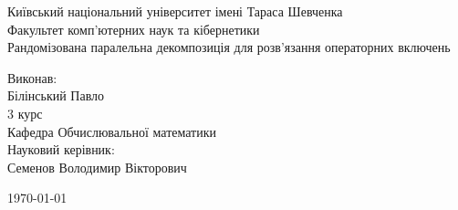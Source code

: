 \documentclass[12pt]{article}
\begin{document}
	\begin{titlepage}
		\begin{center}
			\vspace*{-1cm}
			{\Large Київський національний університет імені Тараса Шевченка \\ 
				Факультет комп'ютерних наук та кібернетики \\}	
			\vspace*{6cm}
			{\huge Рандомізована паралельна декомпозиція для розв'язання операторних включень
				\vfill
			}	
			
		\end{center}
		\begin{flushright}
			{\Large
				Виконав: \\
				Білінський Павло \\
				3 курс \\
				Кафедра Обчислювальної математики \\ 
				\vspace{0.5cm}
				Науковий керівник: \\
				Семенов Володимир Вікторович
			}
		\end{flushright}
		\begin{center}
			\Large
			\today
		\end{center}
	\end{titlepage}
	
	
	\tableofcontents
	
	
	
	
	
	
	
	
	
	
	
	

	
\end{document}
